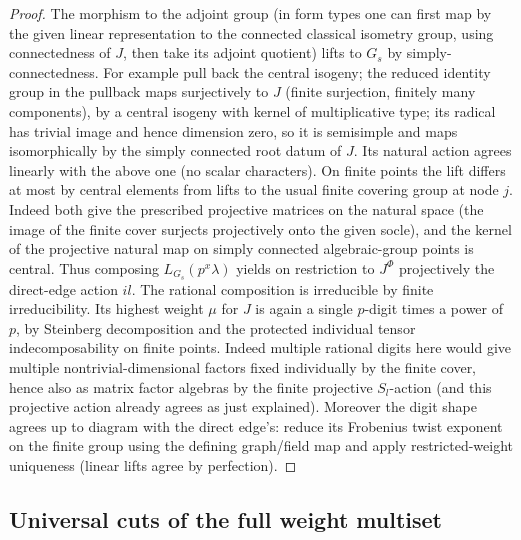 \begin{proof}
The morphism to the adjoint group (in form types one can first map by the given linear representation to the connected classical isometry group, using connectedness of \(J\), then take its adjoint quotient) lifts to \(G_s\) by simply-connectedness. For example pull back the central isogeny; the reduced identity group in the pullback maps surjectively to \(J\) (finite surjection, finitely many components), by a central isogeny with kernel of multiplicative type; its radical has trivial image and hence dimension zero, so it is semisimple and maps isomorphically by the simply connected root datum of \(J\). Its natural action agrees linearly with the above one (no scalar characters). On finite points the lift differs at most by central elements from lifts to the usual finite covering group at node \(j\). Indeed both give the prescribed projective matrices on the natural space (the image of the finite cover surjects projectively onto the given socle), and the kernel of the projective natural map on simply connected algebraic-group points is central. Thus composing \(L_{G_s}(p^x\lambda)\) yields on restriction to \(J^\Phi\) projectively the direct-edge action \(il\). The rational composition is irreducible by finite irreducibility. Its highest weight \(\mu\) for \(J\) is again a single \(p\)-digit times a power of \(p\), by Steinberg decomposition and the protected individual tensor indecomposability on finite points. Indeed multiple rational digits here would give multiple nontrivial-dimensional factors fixed individually by the finite cover, hence also as matrix factor algebras by the finite projective \(S_l\)-action (and this projective action already agrees as just explained). Moreover the digit shape agrees up to diagram with the direct edge's: reduce its Frobenius twist exponent on the finite group using the defining graph/field map and apply restricted-weight uniqueness (linear lifts agree by perfection).
\end{proof}

\subsection{Universal cuts of the full weight multiset}

